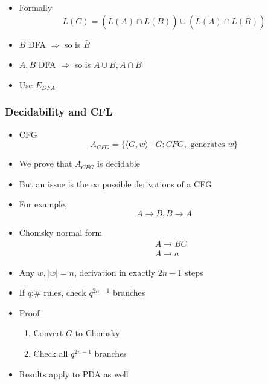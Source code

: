 \begin{frame}[allowframebreaks]
\begin{itemize}
\item Formally
  \begin{equation*}
    L(C)
=(L(A)\cap \overline{L(B)})\cup
(\overline{L(A)}\cap L(B))
  \end{equation*}
\item 
$B$ DFA $\Rightarrow$ so is $\overline{B}$

\item $A, B$ DFA $\Rightarrow$ so is 
$A\cup B, A\cap B$

\item Use $E_{DFA}$
\end{itemize}\end{frame} \begin{frame}[allowframebreaks] \frametitle{Decidability and CFL}
  \begin{itemize}
\item CFG
  \begin{equation*}
    A_{CFG}
=\{\langle  G,w\rangle \mid
G: CFG,\mbox{ generates } w\}
  \end{equation*}
\item We prove that $A_{CFG}$ is decidable
\item But an issue is the $\infty$ possible derivations of a CFG

\item For example,
  \begin{equation*}
  A\rightarrow B, B \rightarrow A
\end{equation*}

\item Chomsky normal form
  \begin{eqnarray*}
    && A \rightarrow BC\\
&& A \rightarrow a
  \end{eqnarray*}

\item Any $w, |w|=n$, derivation in 
exactly $2n-1$ steps

\item If $q$:\# rules, check $q^{2n-1}$ branches

\item Proof
  \begin{enumerate}
  \item Convert $G$ to Chomsky
  \item Check all $q^{2n-1}$ branches
  \end{enumerate}

  \item Results apply to PDA as well


\end{itemize}
\end{frame}
